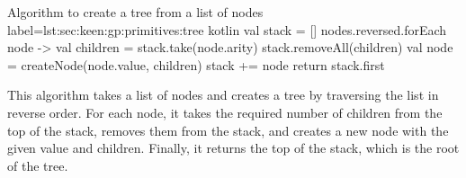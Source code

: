     \begin{code}{Algorithm to create a tree from a list of nodes}{
        label=lst:sec:keen:gp:primitives:tree
    }{kotlin}
        val stack = []
        nodes.reversed.forEach { node ->
            val children = stack.take(node.arity)
            stack.removeAll(children)
            val node = createNode(node.value, children)
            stack += node
        }
        return stack.first
    \end{code}

    This algorithm takes a list of nodes and creates a tree by traversing the list in reverse order. For each node, it 
    takes the required number of children from the top of the stack, removes them from the stack, and creates a new 
    node with the given value and children. Finally, it returns the top of the stack, which is the root of the tree.
